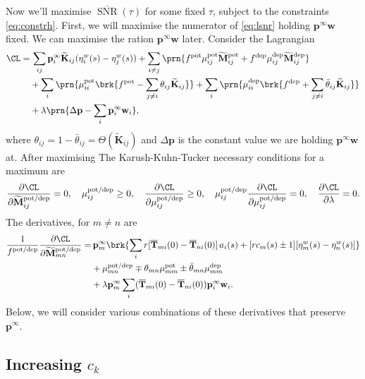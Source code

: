 \documentclass[12pt]{article}
\newcommand{\pr}{\mathbf{p}}
\newcommand{\eq}{\pr^\infty}
\newcommand{\fpt}{\mathbf{T}}
\newcommand{\fptb}{\overline{\fpt}}
\newcommand{\w}{\mathbf{w}}
\newcommand{\M}{\mathbf{M}}
\newcommand{\enc}{\mathbf{K}}
\newcommand{\pot}{^{\text{pot}}}
\newcommand{\dep}{^{\text{dep}}}
\newcommand{\potdep}{^{\text{pot/dep}}}
\newcommand{\Mh}{\widetilde{\M}}
\newcommand{\ench}{\widetilde{\enc}}
\DeclareMathOperator{\snr}{SNR}
\newcommand{\snrb}{\overline{\snr}}
\renewcommand{\pdiff}[2]{\frac{\partial #1}{\partial #2}}
\begin{document}
Now we'll maximise $\snrb(\tau)$ for some fixed $\tau$, subject to the constraints \eqref{eq:constrh}.
First, we will maximise the numerator of \eqref{eq:lsnr} holding $\eq\w$ fixed. 
We can maximise the ration \wrt $\eq\w$ later.
Consider the Lagrangian
%
\begin{equation}\label{eq:finitelagrangian}
\begin{aligned}
  \CL =&\, \sum_{ij} \eq_i \ench_{ij} (\eta^w_i(s) - \eta^w_j(s))
        +\sum_{i\neq j} \prn{ f\pot\mu\pot_{ij} \Mh\pot_{ij} + f\dep\mu\dep_{ij} \Mh\dep_{ij} }\\
        &+\sum_i \prn{ \mu\pot_{ii} \brk{ f\pot - \sum_{j\neq i} \theta_{ij} \ench_{ij} } }
        +\sum_i \prn{ \mu\dep_{ii} \brk{ f\dep + \sum_{j\neq i} \bar{\theta}_{ij} \ench_{ij} } } \\
        &+ \lambda \prn{ \Delta\pr - \sum_i \eq_i\w_i },
\end{aligned}
\end{equation}
%
where $\theta_{ij} = 1-\bar{\theta}_{ij} = \Theta(\ench_{ij})$ and $\Delta\pr$ is the constant value we are holding $\eq\w$ at.
After maximising
The Karush-Kuhn-Tucker necessary conditions for a maximum are
%
\begin{equation}\label{eq:KTfinite}
  \pdiff{\CL}{\Mh\potdep_{ij}} = 0, \quad
  \mu\potdep_{ij} \geq 0, \quad
  \pdiff{\CL}{\mu\potdep_{ij}} \geq 0, \quad
  \mu\potdep_{ij}\pdiff{\CL}{\mu\potdep_{ij}} = 0, \quad
  \pdiff{\CL}{\lambda} = 0.
\end{equation}
%
The derivatives, for $m \neq n$ are
%
\begin{equation}\label{eq:finitederivs}
\begin{aligned}
  \frac{1}{f\potdep} \pdiff{\CL}{\Mh\potdep_{mn}} =& \,  
     \eq_m \brk{ \sum_i r[\fptb_{mi}(0)-\fptb_{ni}(0)]\, a_i(s)
     +[rc_m(s) \pm 1] [\eta^w_m(s) - \eta^w_n(s)] } \\
     &+ \mu\potdep_{mn} \mp  \theta_{mn} \mu\pot_{mm} \pm  \bar{\theta}_{mn} \mu\dep_{mm} \\
     &+ \lambda \eq_m \sum_i (\fptb_{mi}(0)-\fptb_{ni}(0)) \eq_i\w_i.
\end{aligned}
\end{equation}
%
Below, we will consider various combinations of these derivatives that preserve $\eq$.

\subsection{Increasing \texorpdfstring{$c_k$}{c(k)}}\label{sec:areacoeffincr}
\end{document}
